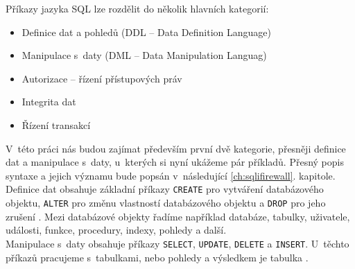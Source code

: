 Příkazy jazyka SQL lze rozdělit do několik hlavních kategorií:
\begin{itemize}
\item Definice dat a pohledů (DDL -- Data Definition Language)
\item Manipulace s~daty (DML -- Data Manipulation Languag)
\item Autorizace -- řízení přístupových práv
\item Integrita dat 
\item Řízení transakcí \cite[str. 6]{ZendulkaIDS}
\end{itemize} 
\vspace*{\baselineskip}
V~této práci nás budou zajímat především první dvě kategorie, přesněji definice dat a manipulace s~daty, u~kterých si nyní ukážeme pár příkladů.
Přesný popis syntaxe a jejich významu bude popsán v~následující \ref{ch:sqlifirewall}. kapitole. \\

\Bat{} Definice dat obsahuje základní příkazy \texttt{CREATE} pro vytváření databázového objektu, \texttt{ALTER} 
pro změnu vlastností databázového objektu a \texttt{DROP} pro jeho zrušení \cite[str. 7]{ZendulkaIDS}.
Mezi databázové objekty řadíme například databáze, tabulky, uživatele, události, funkce, procedury, indexy, pohledy a další. \\

Manipulace s~daty obsahuje příkazy \texttt{SELECT}, \texttt{UPDATE}, \texttt{DELETE} a \texttt{INSERT}.
U~těchto příkazů pracujeme s~tabulkami, nebo pohledy a výsledkem je tabulka \cite[str. 18]{ZendulkaIDS}.

